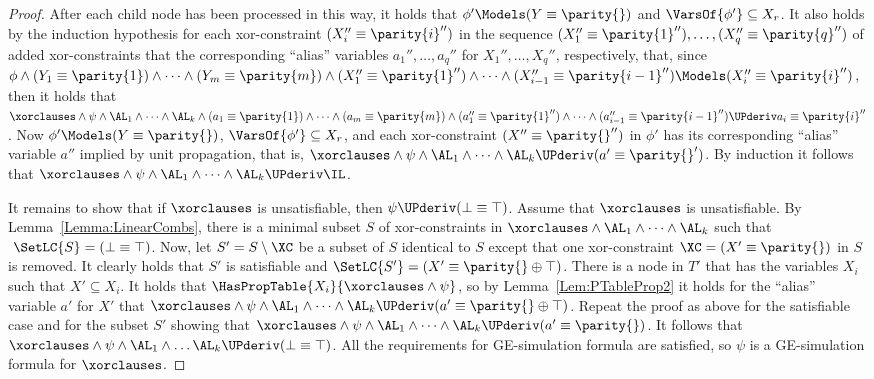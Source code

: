 \begin{proof}
After each child node has been processed in this way, it holds that $\phi'
\Models (Y \equiv \parity{}) $ and $\VarsOf{\phi'} \subseteq X_r $.
It also holds by the induction hypothesis for each xor-constraint $ (X_i'' \equiv \parity{i}'') $ in the
sequence $ (X_1'' \equiv \parity{1}''), \dots, (X_q'' \equiv \parity{q}'') $ of
added xor-constraints that the corresponding ``alias'' variables $a_1'', \dots,
      a_q''$ for $X_1'', \dots, X_q''$, respectively, that,
      since $ \phi \wedge (Y_1 \equiv \parity{1}) \wedge \dots \wedge (Y_m \equiv \parity{m}) \wedge (X_{1}'' \equiv \parity{1}'') \wedge \dots \wedge (X_{i-1}'' \equiv \parity{i-1}'') \Models (X_{i}'' \equiv \parity{i}'')$, then it holds
      that $\xorclauses \wedge \psi \wedge \AL_1 \wedge \dots \wedge \AL_k \wedge (a_1 \equiv \parity{1}) \wedge \dots \wedge (a_m \equiv \parity{m}) \wedge (a_1'' \equiv \parity{1}'') \wedge \dots \wedge (a_{i-1}'' \equiv \parity{i-1}'') \UPderiv a_i \equiv \parity{i}''$. 
Now $\phi' \Models (Y \equiv \parity{}) $, $\VarsOf{\phi'} \subseteq X_r$,
and each xor-constraint $ (X'' \equiv \parity{}'') $ in $\phi'$ has its corresponding ``alias'' variable $ a'' $ implied by unit propagation, that is, $\xorclauses \wedge \psi \wedge \AL_1 \wedge \dots \wedge \AL_k \UPderiv (a' \equiv \parity{}') $.
By induction it follows that $\xorclauses \wedge \psi \wedge \AL_1 \wedge \dots \wedge
\AL_k \UPderiv \IL $.

It remains to show that if $\xorclauses$ is unsatisfiable,
then $\psi \UPderiv (\bot \equiv \top)$. Assume that 
$\xorclauses$ is unsatisfiable. 
By Lemma~\ref{Lemma:LinearCombs}, there is a minimal subset $S$ of
xor-constraints in $ \xorclauses \wedge \AL_1 \wedge \dots \wedge \AL_k $
such that $ \SetLC{S} = (\bot \equiv \top) $. 
Now, let $ S' = S \setminus \XC $
be a subset of $S$ identical to $S$ except that one xor-constraint $\XC = (X' \equiv \parity{}) $ in $S$ is removed.
It clearly holds that $S'$ is satisfiable and $ \SetLC{S'} = (X' \equiv \parity{} \oplus \top) $. 
There is a node in $T'$ that has the variables $X_i$ such that $ X' \subseteq X_i$.
It holds that $ \HasPropTable{X_i}{\xorclauses \wedge \psi}$, so by Lemma~\ref{Lem:PTableProp2} it holds for the ``alias'' variable $a' $ for $X'$ that 
$\xorclauses \wedge \psi \wedge \AL_1 \wedge \dots \wedge \AL_k \UPderiv (a' \equiv \parity{} \oplus \top) $.
Repeat the proof as above for the satisfiable case and for the subset $S'$ showing
that $ \xorclauses \wedge \psi \wedge \AL_1 \wedge \dots \wedge \AL_k \UPderiv 
(a' \equiv \parity{}) $.
It follows that $ 
\xorclauses \wedge \psi \wedge \AL_1 \wedge \dots \AL_k \UPderiv (\bot \equiv \top) $.
All the requirements for GE-simulation formula are satisfied, so 
$\psi$ is a GE-simulation formula for $\xorclauses$.
\end{proof}



